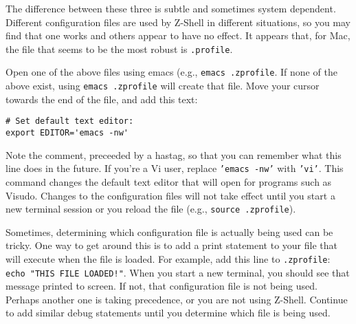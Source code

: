 \documentclass[12pt, letterpaper]{article}
\begin{document}
The difference between these three is subtle and sometimes system dependent.
Different configuration files are used by Z-Shell in different situations, so
you may find that one works and others appear to have no effect.
It appears that, for Mac, the file that seems to be the most robust is
{\tt .profile}.

Open one of the above files using emacs (e.g., {\tt emacs .zprofile}.  If
none of the above exist, using {\tt emacs .zprofile} will create that file.
Move your cursor towards the end of the file, and add this text:
\begin{verbatim}
# Set default text editor:
export EDITOR='emacs -nw'
\end{verbatim}
Note the comment, preceeded by a hastag, so that you can remember what this
line does in the future.
If you're a Vi user, replace {\tt 'emacs -nw'} with {\tt 'vi'}.  This command
changes the default text editor that will open for programs such as
Visudo.
Changes to the configuration files will not take effect until you start a
new terminal session or you reload the file (e.g., {\tt source .zprofile}).

Sometimes, determining which configuration file is actually being used can
be tricky. One way to get around this is to add a print statement to your file
that will execute when the file is loaded. For example, add this line to
{\tt .zprofile}: {\tt echo "THIS FILE LOADED!"}. When you start a new
terminal, you should see that message printed to screen. If not, that
configuration file is not being used. Perhaps another one is taking precedence,
or you are not using Z-Shell. Continue to add similar debug statements until
you determine which file is being used.
\end{document}
